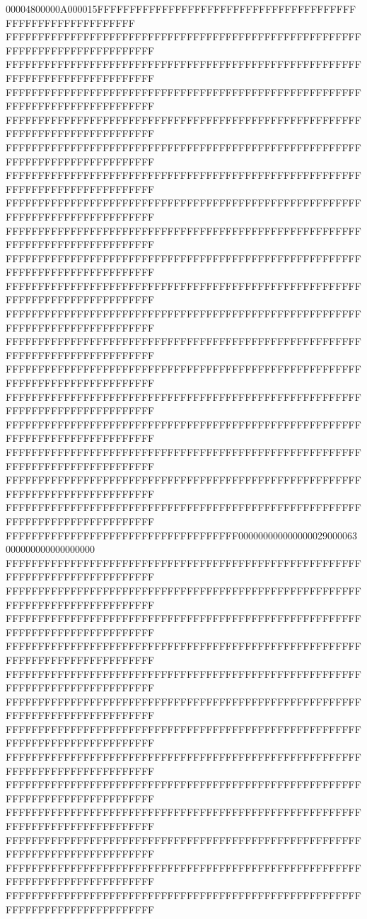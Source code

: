 00004800000A000015FFFFFFFFFFFFFFFFFFFFFFFFFFFFFFFFFFFFFFFFFFFFFFFFFFFFFFFFFFFF
FFFFFFFFFFFFFFFFFFFFFFFFFFFFFFFFFFFFFFFFFFFFFFFFFFFFFFFFFFFFFFFFFFFFFFFFFFFFFF
FFFFFFFFFFFFFFFFFFFFFFFFFFFFFFFFFFFFFFFFFFFFFFFFFFFFFFFFFFFFFFFFFFFFFFFFFFFFFF
FFFFFFFFFFFFFFFFFFFFFFFFFFFFFFFFFFFFFFFFFFFFFFFFFFFFFFFFFFFFFFFFFFFFFFFFFFFFFF
FFFFFFFFFFFFFFFFFFFFFFFFFFFFFFFFFFFFFFFFFFFFFFFFFFFFFFFFFFFFFFFFFFFFFFFFFFFFFF
FFFFFFFFFFFFFFFFFFFFFFFFFFFFFFFFFFFFFFFFFFFFFFFFFFFFFFFFFFFFFFFFFFFFFFFFFFFFFF
FFFFFFFFFFFFFFFFFFFFFFFFFFFFFFFFFFFFFFFFFFFFFFFFFFFFFFFFFFFFFFFFFFFFFFFFFFFFFF
FFFFFFFFFFFFFFFFFFFFFFFFFFFFFFFFFFFFFFFFFFFFFFFFFFFFFFFFFFFFFFFFFFFFFFFFFFFFFF
FFFFFFFFFFFFFFFFFFFFFFFFFFFFFFFFFFFFFFFFFFFFFFFFFFFFFFFFFFFFFFFFFFFFFFFFFFFFFF
FFFFFFFFFFFFFFFFFFFFFFFFFFFFFFFFFFFFFFFFFFFFFFFFFFFFFFFFFFFFFFFFFFFFFFFFFFFFFF
FFFFFFFFFFFFFFFFFFFFFFFFFFFFFFFFFFFFFFFFFFFFFFFFFFFFFFFFFFFFFFFFFFFFFFFFFFFFFF
FFFFFFFFFFFFFFFFFFFFFFFFFFFFFFFFFFFFFFFFFFFFFFFFFFFFFFFFFFFFFFFFFFFFFFFFFFFFFF
FFFFFFFFFFFFFFFFFFFFFFFFFFFFFFFFFFFFFFFFFFFFFFFFFFFFFFFFFFFFFFFFFFFFFFFFFFFFFF
FFFFFFFFFFFFFFFFFFFFFFFFFFFFFFFFFFFFFFFFFFFFFFFFFFFFFFFFFFFFFFFFFFFFFFFFFFFFFF
FFFFFFFFFFFFFFFFFFFFFFFFFFFFFFFFFFFFFFFFFFFFFFFFFFFFFFFFFFFFFFFFFFFFFFFFFFFFFF
FFFFFFFFFFFFFFFFFFFFFFFFFFFFFFFFFFFFFFFFFFFFFFFFFFFFFFFFFFFFFFFFFFFFFFFFFFFFFF
FFFFFFFFFFFFFFFFFFFFFFFFFFFFFFFFFFFFFFFFFFFFFFFFFFFFFFFFFFFFFFFFFFFFFFFFFFFFFF
FFFFFFFFFFFFFFFFFFFFFFFFFFFFFFFFFFFFFFFFFFFFFFFFFFFFFFFFFFFFFFFFFFFFFFFFFFFFFF
FFFFFFFFFFFFFFFFFFFFFFFFFFFFFFFFFFFFFFFFFFFFFFFFFFFFFFFFFFFFFFFFFFFFFFFFFFFFFF
FFFFFFFFFFFFFFFFFFFFFFFFFFFFFFFFFFFF000000000000000029000063000000000000000000
FFFFFFFFFFFFFFFFFFFFFFFFFFFFFFFFFFFFFFFFFFFFFFFFFFFFFFFFFFFFFFFFFFFFFFFFFFFFFF
FFFFFFFFFFFFFFFFFFFFFFFFFFFFFFFFFFFFFFFFFFFFFFFFFFFFFFFFFFFFFFFFFFFFFFFFFFFFFF
FFFFFFFFFFFFFFFFFFFFFFFFFFFFFFFFFFFFFFFFFFFFFFFFFFFFFFFFFFFFFFFFFFFFFFFFFFFFFF
FFFFFFFFFFFFFFFFFFFFFFFFFFFFFFFFFFFFFFFFFFFFFFFFFFFFFFFFFFFFFFFFFFFFFFFFFFFFFF
FFFFFFFFFFFFFFFFFFFFFFFFFFFFFFFFFFFFFFFFFFFFFFFFFFFFFFFFFFFFFFFFFFFFFFFFFFFFFF
FFFFFFFFFFFFFFFFFFFFFFFFFFFFFFFFFFFFFFFFFFFFFFFFFFFFFFFFFFFFFFFFFFFFFFFFFFFFFF
FFFFFFFFFFFFFFFFFFFFFFFFFFFFFFFFFFFFFFFFFFFFFFFFFFFFFFFFFFFFFFFFFFFFFFFFFFFFFF
FFFFFFFFFFFFFFFFFFFFFFFFFFFFFFFFFFFFFFFFFFFFFFFFFFFFFFFFFFFFFFFFFFFFFFFFFFFFFF
FFFFFFFFFFFFFFFFFFFFFFFFFFFFFFFFFFFFFFFFFFFFFFFFFFFFFFFFFFFFFFFFFFFFFFFFFFFFFF
FFFFFFFFFFFFFFFFFFFFFFFFFFFFFFFFFFFFFFFFFFFFFFFFFFFFFFFFFFFFFFFFFFFFFFFFFFFFFF
FFFFFFFFFFFFFFFFFFFFFFFFFFFFFFFFFFFFFFFFFFFFFFFFFFFFFFFFFFFFFFFFFFFFFFFFFFFFFF
FFFFFFFFFFFFFFFFFFFFFFFFFFFFFFFFFFFFFFFFFFFFFFFFFFFFFFFFFFFFFFFFFFFFFFFFFFFFFF
FFFFFFFFFFFFFFFFFFFFFFFFFFFFFFFFFFFFFFFFFFFFFFFFFFFFFFFFFFFFFFFFFFFFFFFFFFFFFF
